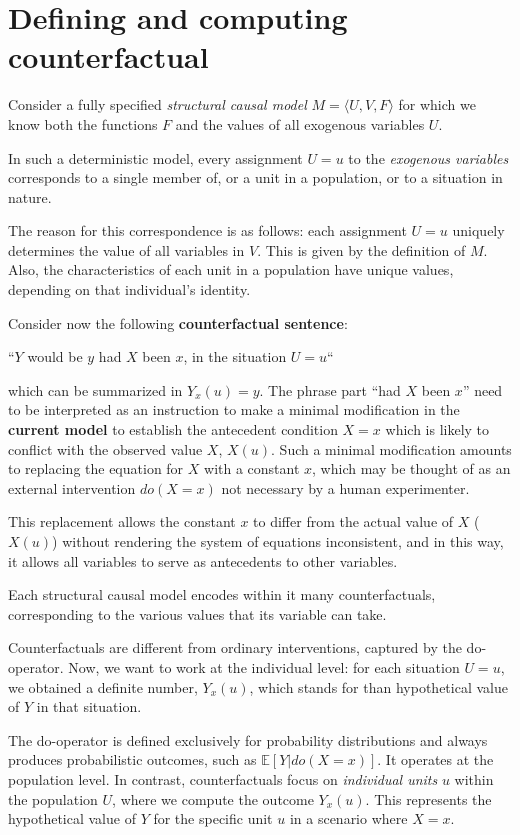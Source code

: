 \section{Defining and computing counterfactual}
Consider a fully specified \textit{structural causal model} $M=\langle U, V,F \rangle$
for which we know both the functions $F$ and the values of all exogenous variables $U$.

In such a deterministic model, every assignment $U = u$ to the \textit{exogenous variables}
corresponds to a single member of, or a unit in a population, or to a situation
in nature.

The reason for this correspondence is as follows: each assignment $U = u$ uniquely
determines the value of all variables in $V$. This is given by the definition of $M$.
Also, the characteristics of each unit in a population have unique values, depending
on that individual's identity.

Consider now the following \textbf{counterfactual sentence}:
\begin{center}
    ``$Y$ would be $y$ had $X$ been $x$, in the situation $U = u$``
\end{center}
which can be summarized in $Y_x(u) = y$. The phrase part ``had $X$ been $x$''
need to be interpreted as an instruction to make a minimal modification in the
\textbf{current model} to establish the antecedent condition $X = x$ which is
likely to conflict with the observed value $X$, $X(u)$. Such a minimal modification
amounts to replacing the equation for $X$ with a constant $x$, which may be thought
of as an external intervention $do(X = x)$ not necessary by a human experimenter.

This replacement allows the constant $x$ to differ from the actual value of $X$
($X(u)$) without rendering the system of equations inconsistent, and in this way,
it allows all variables to serve as antecedents to other variables.

Each structural causal model encodes within it many counterfactuals, corresponding
to the various values that its variable can take.

Counterfactuals are different from ordinary interventions, captured by the
do-operator. Now, we want to work at the individual level: for each situation $U = u$,
we obtained a definite number, $Y_x(u)$, which stands for than hypothetical value
of $Y$ in that situation.

The do-operator is defined exclusively for probability distributions and always
produces probabilistic outcomes, such as $\mathbb{E}[Y|do(X = x)]$. It operates at
the population level. In contrast, counterfactuals focus on \textit{individual units}
$u$ within the population $U$, where we compute the outcome $Y_x(u)$. This represents
the hypothetical value of $Y$ for the specific unit $u$ in a scenario where $X = x$.

